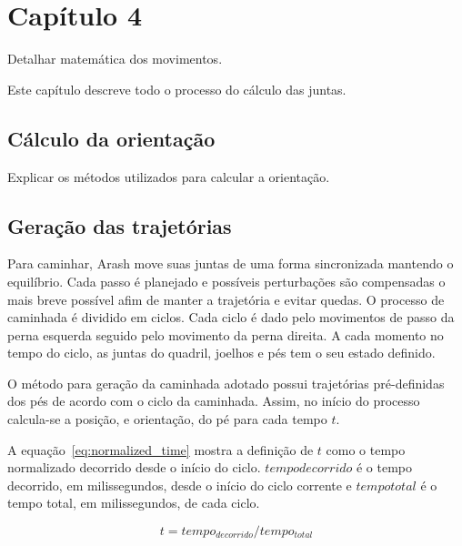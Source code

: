 \chapter{Capítulo 4}
\label{ch:Math}

\begin{guide}
	Detalhar matemática dos movimentos.
\end{guide}

\begin{draft}
	Este capítulo descreve todo o processo do cálculo das juntas.
\end{draft}

\section{Cálculo da orientação}

\begin{guide}
	Explicar os métodos utilizados para calcular a orientação.
\end{guide}

\section{Geração das trajetórias}

Para caminhar, Arash move suas juntas de uma forma sincronizada mantendo o equilíbrio. Cada passo é planejado e possíveis perturbações são compensadas o mais breve possível afim de manter a trajetória e evitar quedas. O processo de caminhada é dividido em ciclos. Cada ciclo é dado pelo movimentos de passo da perna esquerda seguido pelo movimento da perna direita. A cada momento no tempo do ciclo, as juntas do quadril, joelhos e pés tem o seu estado definido.

O método para geração da caminhada adotado possui trajetórias pré-definidas dos pés de acordo com o ciclo da caminhada. Assim, no início do processo calcula-se a posição, e orientação, do pé para cada tempo $t$.

A equação~\ref{eq:normalized_time} mostra a definição de $t$ como o tempo normalizado decorrido desde o início do ciclo. $tempo{decorrido}$ é o tempo decorrido, em milissegundos, desde o início do ciclo corrente e $tempo{total}$ é o tempo total, em milissegundos, de cada ciclo. 

\begin{equation}
t = tempo_{decorrido} / tempo_{total}
\label{eq:normalized_time}
\end{equation}

